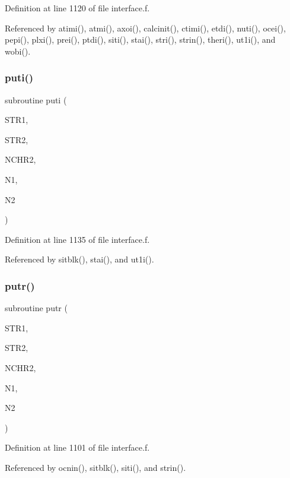 Definition at line 1120 of file interface.\+f.



Referenced by atimi(), atmi(), axoi(), calcinit(), ctimi(), etdi(), nuti(), ocei(), pepi(), plxi(), prei(), ptdi(), siti(), stai(), stri(), strin(), theri(), ut1i(), and wobi().

\mbox{\label{interface_8f_af642734b207cfc92a030baecf317b152}} 
\subsubsection{\texorpdfstring{puti()}{puti()}}
{\footnotesize\ttfamily subroutine puti (\begin{DoxyParamCaption}\item[{character$\ast$14}]{S\+T\+R1,  }\item[{integer$\ast$2, dimension(nchr2)}]{S\+T\+R2,  }\item[{integer$\ast$2}]{N\+C\+H\+R2,  }\item[{integer$\ast$2}]{N1,  }\item[{integer$\ast$2}]{N2 }\end{DoxyParamCaption})}



Definition at line 1135 of file interface.\+f.



Referenced by sitblk(), stai(), and ut1i().

\mbox{\label{interface_8f_aaec75c0e539fcc5c41612a47078fbb5c}} 
\subsubsection{\texorpdfstring{putr()}{putr()}}
{\footnotesize\ttfamily subroutine putr (\begin{DoxyParamCaption}\item[{character$\ast$14}]{S\+T\+R1,  }\item[{real$\ast$8, dimension(nchr2,n1)}]{S\+T\+R2,  }\item[{integer$\ast$2}]{N\+C\+H\+R2,  }\item[{integer$\ast$2}]{N1,  }\item[{integer$\ast$2}]{N2 }\end{DoxyParamCaption})}



Definition at line 1101 of file interface.\+f.



Referenced by ocnin(), sitblk(), siti(), and strin().

